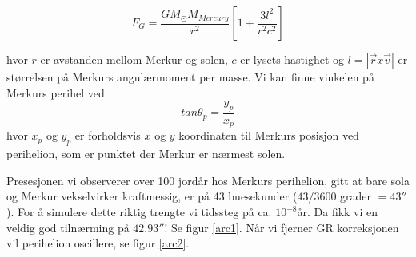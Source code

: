 \documentclass[11pt,a4paper]{article}
\begin{document}
\begin{equation}
F_G = \frac{GM_{\odot}M_{Mercury}}{r^2}\left[1 + \frac{3l^2}{r^2c^2} \right]
\end{equation}

hvor $r$ er avstanden mellom Merkur og solen, $c$ er lysets hastighet og $l = |\vec{r}x\vec{v}|$ er størrelsen på Merkurs angulærmoment per masse. Vi kan finne vinkelen på Merkurs perihel ved 
\[tan \theta_p = \frac{y_p}{x_p} \]
hvor $x_p$ og $y_p$ er forholdsvis $x$ og $y$ koordinaten til Merkurs posisjon ved perihelion, som er punktet der Merkur er nærmest solen.

Presesjonen vi observerer over 100 jordår hos Merkurs perihelion, gitt at bare sola og Merkur vekselvirker kraftmessig, er på 43 buesekunder ($43/3600$ grader $= 43''$).
For å simulere dette riktig trengte vi tidssteg på ca. $10^{-8}$år. Da fikk vi en veldig god tilnærming på $42.93''$! Se figur \ref{arc1}. Når vi fjerner GR korreksjonen vil perihelion oscillere, se figur \ref{arc2}.\\
\end{document}
